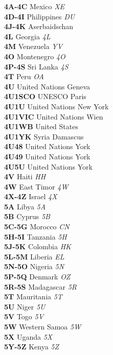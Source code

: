 \documentclass[landscape,a4paper]{article}
\begin{document}
\begin{multicols}{7}
\textbf{4A-4C} Mexico \emph{XE} \\
\textbf{4D-4I} Philippines \emph{DU} \\
\textbf{4J-4K} Aserbaidschan \\
\textbf{4L} Georgia \emph{4L} \\
\textbf{4M} Venezuela \emph{YV} \\
\textbf{4O} Montenegro \emph{4O} \\
\textbf{4P-4S} Sri Lanka \emph{4S} \\
\textbf{4T} Peru \emph{OA} \\
\textbf{4U} United Nations Geneva \\
\textbf{4U1SCO} UNESCO Paris \\
\textbf{4U1U} United Nations New York \\
\textbf{4U1VIC} United Nations Wien \\
\textbf{4U1WB} United States \\
\textbf{4U1YK} Syria Damascus \\
\textbf{4U48} United Nations York \\
\textbf{4U49} United Nations York \\
\textbf{4U5U} United Nations York \\
\textbf{4V} Haiti \emph{HH} \\
\textbf{4W} East Timor \emph{4W} \\
\textbf{4X-4Z} Israel \emph{4X} \\
\textbf{5A} Libya \emph{5A} \\
\textbf{5B} Cyprus \emph{5B} \\
\textbf{5C-5G} Morocco \emph{CN} \\
\textbf{5H-5I} Tanzania \emph{5H} \\
\textbf{5J-5K} Colombia \emph{HK} \\
\textbf{5L-5M} Liberia \emph{EL} \\
\textbf{5N-5O} Nigeria \emph{5N} \\
\textbf{5P-5Q} Denmark \emph{OZ} \\
\textbf{5R-5S} Madagascar \emph{5R} \\
\textbf{5T} Mauritania \emph{5T} \\
\textbf{5U} Niger \emph{5U} \\
\textbf{5V} Togo \emph{5V} \\
\textbf{5W} Western Samoa \emph{5W} \\
\textbf{5X} Uganda \emph{5X} \\
\textbf{5Y-5Z} Kenya \emph{5Z} \\

\end{multicols}
\end{document}

